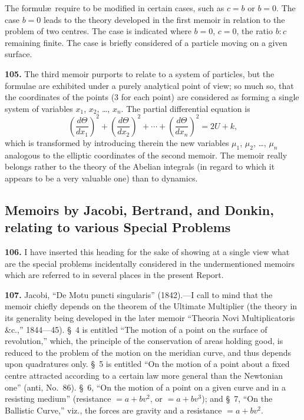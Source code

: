 \documentclass[11pt,a4paper]{book}
\begin{document}
The formul\ae\ require to be modified in certain cases, such as $c = b$ or $b = 0$. The case $b = 0$ leads to the theory developed in the first memoir in relation to the problem of two centres. The case is indicated where $b = 0$, $c = 0$, the ratio $b : c$ remaining finite. The case is briefly considered of a particle moving on a given surface.

\textbf{105.} The third memoir purports to relate to a system of particles, but the formulae are exhibited under a purely analytical point of view; so much so, that the coordinates of the points (3 for each point) are considered as forming a single system of variables $x_1$, $x_2$, \dots, $x_n$. The partial differential equation is
\[
\left(\frac{d\Theta}{dx_1}\right)^2 + \left(\frac{d\Theta}{dx_2}\right)^2 + \cdots + \left(\frac{d\Theta}{dx_n}\right)^2 = 2U + k,
\]
which is transformed by introducing therein the new variables $\mu_1$, $\mu_2$, \dots, $\mu_n$ analogous to the elliptic coordinates of the second memoir. The memoir really belongs rather to the theory of the Abelian integrals (in regard to which it appears to be a very valuable one) than to dynamics.


\subsection*{Memoirs by Jacobi, Bertrand, and Donkin, relating to various Special Problems}

\textbf{106.} I have inserted this heading for the sake of showing at a single view what are the special problems incidentally considered in the undermentioned memoirs which are referred to in several places in the present Report.

\textbf{107.} Jacobi, ``De Motu puncti singularis'' (1842).---I call to mind that the memoir chiefly depends on the theorem of the Ultimate Multiplier (the theory in its generality being developed in the later memoir ``Theoria Novi Multiplicatoris \&c.,'' 1844---45). \S~4 is entitled ``The motion of a point on the surface of revolution,'' which, the principle of the conservation of areas holding good, is reduced to the problem of the motion on the meridian curve, and thus depends upon quadratures only. \S~5 is entitled ``On the motion of a point about a fixed centre attracted according to a certain law more general than the Newtonian one'' (anti, No.~86). \S~6, ``On the motion of a point on a given curve and in a resisting medium'' (resistance $= a + bv^2$, or $= a + bv^3$); and \S~7, ``On the Ballistic Curve,'' viz., the forces are gravity and a resistance $= a + bv^2$.
\end{document}
